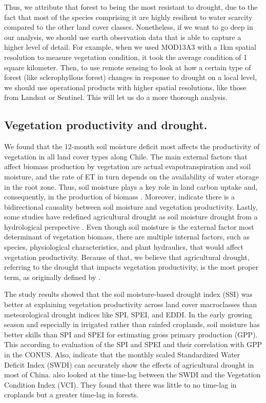 \documentclass[
  authoryear,
  preprint,
  3p,
  onecolumn]{elsarticle}
\begin{document}
Thus, we attribute that forest to being the most resistant to drought,
due to the fact that most of the species comprising it are highly
resilient to water scarcity compared to the other land cover classes.
Nonetheless, if we want to go deep in our analysis, we should use earth
observation data that is able to capture a higher level of detail. For
example, when we used MOD13A3 with a 1km spatial resolution to measure
vegetation condition, it took the average condition of 1 square
kilometer. Then, to use remote sensing to look at how a certain type of
forest (like sclerophyllous forest) changes in response to drought on a
local level, we should use operational products with higher spatial
resolutions, like those from Landsat or Sentinel. This will let us do a
more thorough analysis.

\hypertarget{vegetation-productivity-and-drought.}{%
\subsection{Vegetation productivity and
drought.}\label{vegetation-productivity-and-drought.}}

We found that the 12-month soil moisture deficit most affects the
productivity of vegetation in all land cover types along Chile. The main
external factors that affect biomass production by vegetation are actual
evapotranspiration and soil moisture, and the rate of ET in turn depends
on the availability of water storage in the root zone. Thus, soil
moisture plays a key role in land carbon uptake and, consequently, in
the production of biomass \citep{Humphrey2021}. Moreover,
\citet{Zhang2022} indicate there is a bidirectional causality between
soil moisture and vegetation productivity. Lastly, some studies have
redefined agricultural drought as soil moisture drought from a
hydrological perspective \citep{Loon2016, Samaniego2018}. Even though
soil moisture is the external factor most determinant of vegetation
biomass, there are multiple internal factors, such as species,
physiological characteristics, and plant hydraulics, that would affect
vegetation productivity. Because of that, we believe that agricultural
drought, referring to the drought that impacts vegetation productivity,
is the most proper term, as originally defined by \citet{Wilhite1985}.

The study results showed that the soil moisture-based drought index
(SSI) was better at explaining vegetation productivity across land cover
macroclasses than meteorological drought indices like SPI, SPEI, and
EDDI. In the early growing season and especially in irrigated rather
than rainfed croplands, soil moisture has better skills than SPI and
SPEI for estimating gross primary production (GPP). This according to
\citet{Chatterjee2022} evaluation of the SPI and SPEI and their
correlation with GPP in the CONUS. Also, \citet{Zhou2021} indicate that
the monthly scaled Standardized Water Deficit Index (SWDI) can
accurately show the effects of agricultural drought in most of China.
\citet{Nicolai2017} also looked at the time-lag between the SWDI and the
Vegetation Condition Index (VCI). They found that there was little to no
time-lag in croplands but a greater time-lag in forests.
\end{document}
